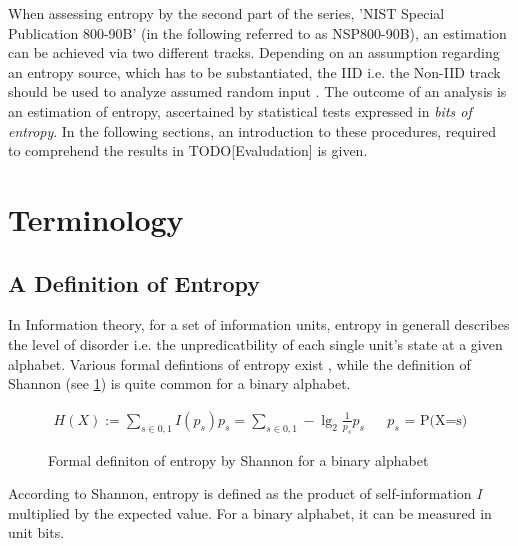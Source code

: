  When assessing entropy by the second part of the series, 'NIST Special Publication 800-90B' (in the following referred to as NSP800-90B), an estimation can be achieved via 
two different tracks. Depending on an assumption regarding an entropy source, which has to be substantiated, the IID i.e. the Non-IID track should be used to analyze assumed random input 
\cite{turan2018nist}. The outcome of an analysis is an estimation of entropy, ascertained by statistical tests expressed in \textit{bits of entropy}. In the following sections, an introduction to these procedures, required to comprehend the results in TODO[Evaludation] is given.




\section{Terminology}
\subsection{A Definition of Entropy}
In Information theory, for a set of information units, entropy in generall describes the level of disorder i.e. the unpredicatbility of each single unit's state at a given alphabet. Various formal defintions of entropy exist \cite{hagerty2012entropy}, while the definition of Shannon (see \ref{fig:form-entropy-shan}) is quite common for a binary alphabet. 

\begin{figure}[H]
	\begin{align*}
	\displaystyle H(X) := \sum_{s \in {0,1}} I(p_s) p_s = \sum_{s \in {0,1}} -\lg_2 \frac{1}{p_s} p_s && \text{$p_s$ = P(X=s)}
	\end{align*}
	\caption{Formal definiton of entropy by Shannon for a binary alphabet}
	\label{fig:form-entropy-shan}
\end{figure}
According to Shannon, entropy is defined as the product of self-information \textit{I} multiplied by the expected value. For a binary alphabet, it can be measured in unit bits. 
